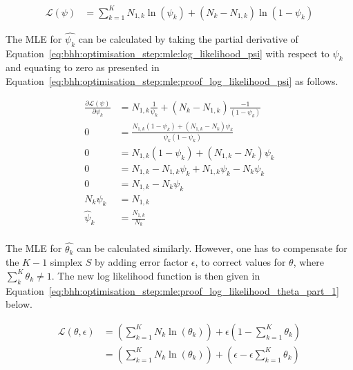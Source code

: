 \begin{equation}
      \label{eq:bhh:optimisation_step:mle:log_likelihood_psi}
      \begin{split}
            \mathcal{L}(\psi) &=  \sum_{k=1}^{K} N_{1,k} \ln \left( \psi_{k} \right) + \left( N_{k} - N_{1,k} \right) \ln \left( 1 - \psi_{k} \right)
      \end{split}
\end{equation}

The \acs{MLE} for $\hat{\psi_{k}} $ can be calculated by taking the partial derivative of Equation~\eqref{eq:bhh:optimisation_step:mle:log_likelihood_psi} with respect to $\psi_{k}$ and equating to zero as presented in Equation~\eqref{eq:bhh:optimisation_step:mle:proof_log_likelihood_psi} as follows.

\begin{equation}
      \label{eq:bhh:optimisation_step:mle:proof_log_likelihood_psi}
      \begin{split}
            \frac{\partial \mathcal{L}(\psi)}{\partial \psi_{k}} &= N_{1,k} \frac{1}{ \psi_{k}} + \left( N_{k} - N_{1,k} \right) \frac{-1}{ \left( 1 - \psi_{k} \right) } \\
            0 &=  \frac{ N_{1,k} \left( 1 - \psi_{k} \right) +  \left( N_{1,k} - N_{k} \right) \psi_{k}}{ \psi_{k} \left( 1 - \psi_{k} \right) } \\
            0 &=  N_{1,k} \left( 1 - \psi_{k} \right) +  \left( N_{1,k} - N_{k} \right) \psi_{k} \\
            0 &=  N_{1,k} - N_{1,k} \psi_{k}  +  N_{1,k} \psi_{k} - N_{k}\psi_{k} \\
            0 &=  N_{1,k} - N_{k}\psi_{k} \\
            N_{k}\psi_{k} &=  N_{1,k} \\
            \hat{\psi}_{k} &=  \frac{N_{1,k}}{N_{k}} \\
      \end{split}
\end{equation}

The \acs{MLE} for $\hat{\theta_{k}} $ can be calculated similarly. However, one has to compensate for the $K-1$ simplex $S$ by adding error factor $\epsilon$, to correct values for $\theta$, where $\sum_{k}^{K} \theta_{k} \neq 1$. The new log likelihood function is then given in Equation~\eqref{eq:bhh:optimisation_step:mle:proof_log_likelihood_theta_part_1} below.

\begin{equation}
      \label{eq:bhh:optimisation_step:mle:proof_log_likelihood_theta_part_1}
      \begin{split}
            \mathcal{L}(\theta, \epsilon)
            &=  \left( \sum_{k=1}^{K} N_{k} \ln \left( \theta_{k} \right) \right) + \epsilon \left( 1 - \sum_{k=1}^{K} \theta_{k} \right) \\
            &=  \left( \sum_{k=1}^{K} N_{k} \ln \left( \theta_{k} \right) \right) + \left( \epsilon -  \epsilon \sum_{k=1}^{K} \theta_{k} \right)
      \end{split}
\end{equation}

